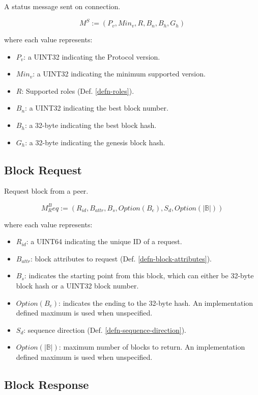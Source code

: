 \documentclass{book}
\begin{document}
A status message sent on connection.

\[
    M^S := (P_v, Min_v, R, B_n, B_h, G_h)
\]

where each value represents:

\begin{itemize}
    \item $P_v$: a UINT32 indicating the Protocol version.
    \item $Min_v$: a UINT32 indicating the minimum supported version.
    \item $R$: Supported roles (Def. \ref{defn-roles}).
    \item $B_n$: a UINT32 indicating the best block number.
    \item $B_h$: a 32-byte indicating the best block hash.
    \item $G_h$: a 32-byte indicating the genesis block hash.
\end{itemize}

\subsection{Block Request}\label{sect-block-request}

Request block from a peer.

\[
    M^B_Req := (R_{id}, B_{attr}, B_s, Option(B_e), S_d, Option(|\mathbb{B}|))
\]

where each value represents:

\begin{itemize}
    \item $R_{id}$: a UINT64 indicating the unique ID of a request.
    \item $B_{attr}$: block attributes to request (Def.
    \ref{defn-block-attributes}).
    \item $B_s$: indicates the starting point from this block, which can either
    be 32-byte block hash or a UINT32 block number.
    \item $Option(B_e)$: indicates the ending to the 32-byte hash. An
    implementation defined maximum is used when unspecified.
    \item $S_d$: sequence direction (Def. \ref{defn-sequence-direction}). 
    \item $Option(|\mathbb{B}|)$: maximum number of blocks to return. An implementation
    defined maximum is used when unspecified.
\end{itemize}

\subsection{Block Response}
\end{document}

